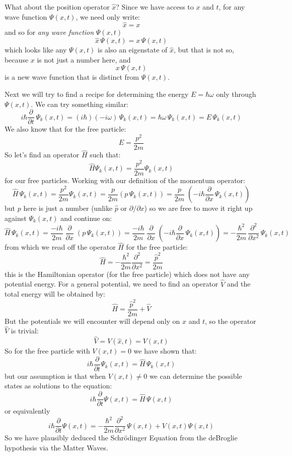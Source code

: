 \documentclass[12pt]{book}
\begin{document}
What about the position operator $\hat{x}$?  Since we have access to $x$ and $t$, for any wave function $\Psi(x,t)$, we need only write:
\begin{equation}
\hat{x} = x
\end{equation}
and so for {\em any wave function} $\Psi(x,t)$
$$\hat{x} \, \Psi(x,t) = x \, \Psi(x,t)$$
which looks like any $\Psi(x,t)$ is also an eigenstate of $\hat{x}$, but that is not so, because $x$ is not just a number here, and 
$$x \, \Psi(x,t)$$
is a new wave function that is distinct from $\Psi(x,t)$.

Next we will try to find a recipe for determining the energy $E=\hbar \omega$ only through $\Psi(x,t)$.  We can try something similar:
$$i\hbar \frac{\partial}{\partial t} \, \Psi_k(x,t) = (i\hbar)(-i\omega) \, \Psi_k(x,t) = \hbar \omega \, \Psi_k(x,t) = E \, \Psi_k(x,t)$$
We also know that for the free particle:
$$E = \frac{p^2}{2m}$$
So let's find an operator $\hat{H}$ such that:
$$\hat{H} \Psi_k(x,t) = \frac{p^2}{2m} \Psi_k(x,t)$$
for our free particles.  Working with our definition of the momentum operator:
$$\hat{H} \, \Psi_k(x,t) = \frac{p^2}{2m} \Psi_k(x,t) = \frac{p}{2m}(p\,\Psi_k(x,t)) = \frac{p}{2m}\;
\left(-i \hbar \frac{\partial}{\partial x}\,\Psi_k(x,t)\right)$$
but $p$ here is just a number (unlike $\hat{p}$ or $\partial/\partial x$) so we are free to move it right up against $\Psi_k(x,t)$ and continue on:
$$\hat{H} \, \Psi_k(x,t) = \frac{-i\hbar}{2m}\;\frac{\partial}{\partial x}\;(p\,\Psi_k(x,t))
= \frac{-i\hbar}{2m}\;\frac{\partial}{\partial x}\;
\left(-i \hbar \frac{\partial}{\partial x}\,\Psi_k(x,t)\right)=-\frac{\hbar^2}{2m}\,\frac{\partial^2}{\partial x^2}\,\Psi_k(x,t)$$
from which we read off the operator $\hat{H}$ for the free particle:
$$\hat{H} = -\frac{\hbar^2}{2m}\frac{\partial^2}{\partial x^2} = \frac{\hat{p}^2}{2m}$$
this is the Hamiltonian operator (for the free particle) which does not have any potential energy.  For a general potential, we need to find an operator $\hat{V}$ and the total energy will be obtained by:
$$\hat{H} = \frac{\hat{p}^2}{2m} + \hat{V}$$
But the potentials we will encounter will depend only on $x$ and $t$, so the operator $\hat{V}$ is trivial:
$$\hat{V} = V(\hat{x},t) = V(x,t)$$
So for the free particle with $V(x,t)=0$ we have shown that:
$$i\hbar \frac{\partial}{\partial t} \Psi_k(x,t) = \hat{H} \, \Psi_k(x,t)$$
but our assumption is that when $V(x,t) \neq 0$ we can determine the possible states as solutions to the equation:
\begin{equation}
i\hbar \frac{\partial}{\partial t} \Psi(x,t) = \hat{H} \, \Psi(x,t)
\end{equation}
or equivalently
\begin{equation}
i\hbar \frac{\partial}{\partial t} \Psi(x,t) = -\frac{\hbar^2}{2m}\frac{\partial^2}{\partial x^2}\, \Psi(x,t) + V(x,t) \Psi(x,t)
\end{equation}
So we have plausibly deduced the Schr\"odinger Equation from the deBroglie hypothesis via the Matter Waves.  
\end{document}
